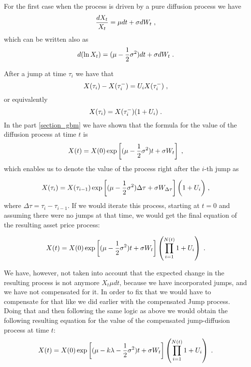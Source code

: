 \documentclass[times, utf8, diplomski]{fer}
\begin{document}
	\noindent For the first case when the process is driven by a pure diffusion process we have
	\begin{equation}
		\frac{dX_t}{X_t} = \mu dt + \sigma dW_t \hspace{0.1cm},
	\end{equation} which can be written also as 
	\begin{equation}
		d(\ln X_t) = (\mu - \frac{1}{2}\sigma^2)dt + \sigma dW_t \hspace{0.1cm}.
	\end{equation}

	\noindent After a jump at time $\tau_i$ we have that
	\begin{equation*}
		X(\tau_i) - X(\tau_i^-) = U_i X(\tau_i^-) \hspace{0.1cm},
	\end{equation*}
	\noindent or equivalently
	\begin{equation}
		X(\tau_i) = X(\tau_i^-)(1 + U_i) \hspace{0.1cm}.
	\end{equation}
	\noindent In the part \ref{section_gbm} we have shown that the formula for the value of the diffusion process at time $t$ is $$X(t) = X(0)\exp\left[ (\mu-\frac{1}{2}\sigma^2)t + \sigma W_t \right]  \hspace{0.1cm}, $$ which enables us to denote the value of the process right after the $i$-th jump as 

	$$X(\tau_i) = X(\tau_{i-1})\exp\left[ (\mu - \frac{1}{2}\sigma^2)\Delta\tau + \sigma W_{\Delta\tau} \right]\bigg(1+U_i\bigg) \hspace{0.1cm},$$ 
	where $\Delta\tau = \tau_i - \tau_{i-1}$. If we would iterate this process, starting at $t=0$ and assuming there were no jumps at that time, we would get the final equation of the resulting asset price process:

	\begin{equation}\label{eqn_jump_diff}
		X(t) = X(0)\exp\left[ (\mu - \frac{1}{2}\sigma^2)t + \sigma W_{t} \right]\left(\prod_{i=1}^{N(t)}1+U_i\right) \hspace{0.1cm}.
	\end{equation}

	\noindent We have, however, not taken into account that the expected change in the resulting process is not anymore $X_t\mu dt$, because we have incorporated jumps, and we have not compensated for it. In order to fix that we would have to compensate for that like we did earlier with the compensated Jump process. Doing that and then following the same logic as above we would obtain the following resulting equation for the value of the compensated jump-diffusion process at time $t$:
	\begin{equation} \label{eqn_jump_diff_compensated}
		X(t) = X(0)\exp\left[ (\mu - k\lambda- \frac{1}{2}\sigma^2)t + \sigma W_{t} \right]\left(\prod_{i=1}^{N(t)}1+U_i\right) \hspace{0.1cm}.
	\end{equation}
\end{document}
